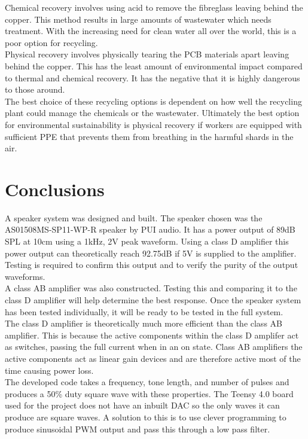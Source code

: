 \documentclass[12pt, a4paper]{article}
\begin{document}
Chemical recovery involves using acid to remove the fibreglass leaving behind the copper. This method results in large amounts of wastewater which needs treatment. With the increasing need for clean water all over the world, this is a poor option for recycling.\\

Physical recovery involves physically tearing the PCB materials apart leaving behind the copper. This has the least amount of environmental impact compared to thermal and chemical recovery. It has the negative that it is highly dangerous to those around.\\

The best choice of these recycling options is dependent on how well the recycling plant could manage the chemicals or the wastewater. Ultimately the best option for environmental sustainability is physical recovery if workers are equipped with sufficient PPE that prevents them from breathing in the harmful shards in the air. \\
\pagebreak
\section{Conclusions}
A speaker system was designed and built. The speaker chosen was the AS01508MS-SP11-WP-R speaker by PUI audio. It has a power output of 89dB SPL at 10cm using a 1kHz, 2V peak waveform. Using a class D amplifier this power output can theoretically reach 92.75dB if 5V is supplied to the amplifier. Testing is required to confirm this output and to verify the purity of the output waveforms.\\

A class AB amplifier was also constructed. Testing this and comparing it to the class D amplifier will help determine the best response. Once the speaker system has been tested individually, it will be ready to be tested in the full system. \\

The class D amplifier is theoretically much more efficient than the class AB amplifier. This is because the active components within the class D amplifer act as switches, passing the full current when in an on state. Class AB amplifiers the active components act as linear gain devices and are therefore active most of the time causing power loss. \\ 

The developed code takes a frequency, tone length, and number of pulses and produces a 50\% duty square wave with these properties. The Teensy 4.0 board used for the project does not have an inbuilt DAC so the only waves it can produce are square waves. A solution to this is to use clever programming to produce sinusoidal PWM output and pass this through a low pass filter. \\
\end{document}
